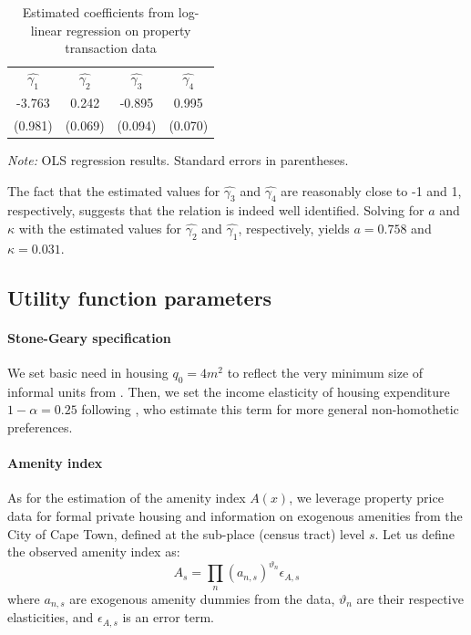 \documentclass[12pt]{article}
\newcommand\fnote[1]{\captionsetup{justification=raggedright,singlelinecheck=false}\caption*{#1}}
\begin{document}
\begin{table}[htbp!]
\centering
\caption{Estimated coefficients from log-linear regression on property transaction data}
\label{tab_hprod_estim}
\begin{tabular}{llll}
\cline{1-4}
\multicolumn{1}{c}{$\widehat{\gamma_1}$}&
\multicolumn{1}{c}{$\widehat{\gamma_2}$}&
\multicolumn{1}{c}{$\widehat{\gamma_3}$}&
\multicolumn{1}{c}{$\widehat{\gamma_4}$}\\
\cline{1-4}
\multicolumn{1}{c}{-3.763}&
\multicolumn{1}{c}{0.242}&
\multicolumn{1}{c}{-0.895}&
\multicolumn{1}{c}{0.995}\\
\multicolumn{1}{c}{(0.981)}&
\multicolumn{1}{c}{(0.069)}&
\multicolumn{1}{c}{(0.094)}&
\multicolumn{1}{c}{(0.070)}\\
\cline{1-4}
\end{tabular}
\fnote{\centering\scriptsize{\textit{Note:} OLS regression results. Standard errors in parentheses.}}
\end{table}

The fact that the estimated values for $\widehat{\gamma_3}$ and $\widehat{\gamma_4}$ are reasonably close to -1 and 1, respectively, suggests that the relation is indeed well identified. Solving for $a$ and $\kappa$ with the estimated values for $\widehat{\gamma_2}$ and $\widehat{\gamma_1}$, respectively, yields $a=0.758$ and $\kappa=0.031$.

\subsection{Utility function parameters}

\paragraph{Stone-Geary specification}

We set basic need in housing $q_0 = 4m^2$ to reflect the very minimum size of informal units from \citet{Rice2023RentingAfrica}. Then, we set the income elasticity of housing expenditure $1-\alpha=0.25$ following \citet{Finlay2022HousingSorting}, who estimate this term for more general non-homothetic preferences.

\paragraph{Amenity index}

As for the estimation of the amenity index $A(x)$, we leverage property price data for formal private housing and information on exogenous amenities from the City of Cape Town, defined at the sub-place (census tract) level $s$. Let us define the observed amenity index as:
\begin{equation*}
    A_s = \prod\limits_{n}(a_{n,s})^{\vartheta_n}\epsilon_{A,s}
\end{equation*}
where $a_{n,s}$ are exogenous amenity dummies from the data, $\vartheta_n$ are their respective elasticities, and $\epsilon_{A,s}$ is an error term.
\end{document}
